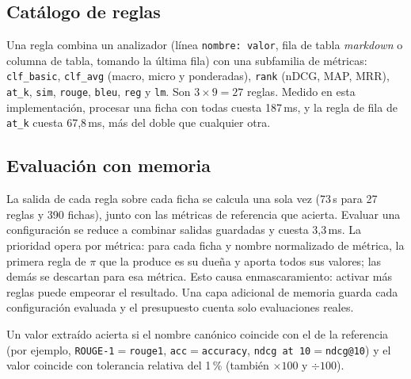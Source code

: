 \documentclass[conference]{IEEEtran}
\begin{document}
	\subsection{Cat\'alogo de reglas}
	Una regla combina un analizador (l\'inea \texttt{nombre: valor}, fila de tabla \emph{markdown} o columna de tabla, tomando la \'ultima fila) con una subfamilia de m\'etricas: \texttt{clf\_basic}, \texttt{clf\_avg} (macro, micro y ponderadas), \texttt{rank} (nDCG, MAP, MRR), \texttt{at\_k}, \texttt{sim}, \texttt{rouge}, \texttt{bleu}, \texttt{reg} y \texttt{lm}. Son $3\times9=27$ reglas. Medido en esta implementaci\'on, procesar una ficha con todas cuesta 187\,ms, y la regla de fila de \texttt{at\_k} cuesta 67,8\,ms, m\'as del doble que cualquier otra.
	
	\subsection{Evaluaci\'on con memoria}
	La salida de cada regla sobre cada ficha se calcula una sola vez (73\,s para 27 reglas y 390 fichas), junto con las m\'etricas de referencia que acierta. Evaluar una configuraci\'on se reduce a combinar salidas guardadas y cuesta 3,3\,ms. La prioridad opera por m\'etrica: para cada ficha y nombre normalizado de m\'etrica, la primera regla de $\pi$ que la produce es su due\~na y aporta todos sus valores; las dem\'as se descartan para esa m\'etrica. Esto causa enmascaramiento: activar m\'as reglas puede empeorar el resultado. Una capa adicional de memoria guarda cada configuraci\'on evaluada y el presupuesto cuenta solo evaluaciones reales.
	
	Un valor extra\'ido acierta si el nombre can\'onico coincide con el de la referencia (por ejemplo, \texttt{ROUGE-1}$=$\texttt{rouge1}, \texttt{acc}$=$\texttt{accuracy}, \texttt{ndcg at 10}$=$\texttt{ndcg@10}) y el valor coincide con tolerancia relativa del 1\,\% (tambi\'en $\times100$ y $\div100$).
	
\end{document}
